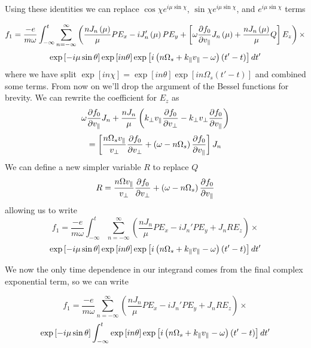 Using these identities we can replace $\cos\chi e^{i\mu\sin\chi}$, $\sin\chi e^{i\mu\sin\chi}$, and $e^{i\mu\sin\chi}$ terms

\begin{equation*}
	f_1 = \frac{-e}{m \omega} \int_{-\infty}^t \sum_{n=-\infty}^\infty \left(\frac{nJ_n\left(\mu\right)}{\mu} P E_x - i J_n' \left(\mu\right) P E_y + \left[\omega \frac{\partial f_0}{\partial v_\parallel} J_n\left(\mu\right) + \frac{nJ_n\left(\mu\right)}{\mu} Q\right]E_z \right) \times
\end{equation*}
\begin{equation}
	\exp \left[-i\mu \sin\theta \right] \exp \left[in \theta \right] \exp \left[i\left(n\Omega_s + k_\parallel v_\parallel - \omega\right) \left(t' - t\right)\right] dt'
\end{equation}
where we have split $\exp \left[in\chi\right] = \exp \left[in\theta \right] \exp \left[in\Omega_s \left(t' - t\right)\right]$ and combined some terms. From now on we'll drop the argument of the Bessel functions for brevity. We can rewrite the coefficient for $E_z$ as
\begin{equation*}
	\omega \frac{\partial f_0}{\partial v_\parallel} J_n + \frac{nJ_n}{\mu} \left( k_\perp v_\parallel\frac{\partial f_0}{\partial v_\perp} - k_\perp v_\perp\frac{\partial f_0}{\partial v_\parallel} \right)
\end{equation*}
\begin{equation}
	 = \left[ \frac{n\Omega_s v_\parallel}{v_\perp} \frac{\partial f_0}{\partial v_\perp} + \left(\omega - n\Omega_s\right) \frac{\partial f_0}{\partial v_\parallel} \right] J_n
\end{equation}
We can define a new simpler variable $R$ to replace $Q$
\begin{equation}
	R = \frac{n\Omega v_\parallel}{v_\perp} \frac{\partial f_0}{\partial v_\perp} + \left(\omega - n\Omega_s\right) \frac{\partial f_0}{\partial v_\parallel}
\end{equation}
allowing us to write
\begin{equation*}
	f_1 = \frac{-e}{m \omega} \int_{-\infty}^t \sum_{n=-\infty}^\infty \left(\frac{nJ_n}{\mu} P E_x - i J_n' P E_y + J_n R E_z \right) \times
\end{equation*}
\begin{equation}
	\exp \left[-i\mu \sin\theta \right] \exp \left[in \theta \right] \exp \left[i\left(n\Omega_s + k_\parallel v_\parallel - \omega\right) \left(t' - t\right)\right] dt'
\end{equation}

We now the only time dependence in our integrand comes from the final complex exponential term, so we can write

\begin{equation*}
	f_1 = \frac{-e}{m \omega} \sum_{n=-\infty}^\infty \left(\frac{nJ_n}{\mu} P E_x - i J_n' P E_y + J_n R E_z \right) \times
\end{equation*}
\begin{equation}
	\exp \left[-i\mu \sin\theta \right] \int_{-\infty}^t \exp \left[in \theta \right] \exp \left[i\left(n\Omega_s + k_\parallel v_\parallel - \omega\right) \left(t' - t\right)\right] dt'
\end{equation}

